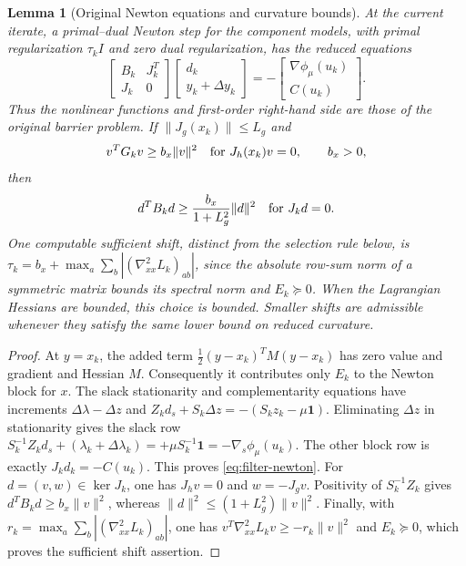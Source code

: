 \documentclass[pdflatex,sn-mathphys-num]{sn-jnl}
\theoremstyle{thmstyleone}
\newtheorem{lemma}[theorem]{Lemma}
\theoremstyle{thmstylethree}
\begin{document}
\begin{lemma}[Original Newton equations and curvature bounds]
\label{lem:filtered-newton}
At the current iterate, a primal--dual Newton step for the component models,
with primal regularization $\tau_k I$ and zero dual regularization,
has the reduced equations
\begin{equation}
 \begin{bmatrix}B_k&J_k^T\\J_k&0\end{bmatrix}
 \begin{bmatrix}d_k\\y_k+\Delta y_k\end{bmatrix}
 =-\begin{bmatrix}\nabla\phi_\mu(u_k)\\C(u_k)\end{bmatrix}.
 \label{eq:filter-newton}
\end{equation}
Thus the nonlinear functions and first-order right-hand side are those
of the original barrier problem.
If $\|J_g(x_k)\|\leq L_g$ and
\begin{equation}
 v^TG_kv\geq b_x\|v\|^2
 \quad\hbox{for }J_h(x_k)v=0,\qquad b_x>0 ,
 \label{eq:filter-physical-coercivity}
\end{equation}
then
\begin{equation}
 d^TB_kd\geq \frac{b_x}{1+L_g^2}\|d\|^2
 \quad\hbox{for }J_kd=0 .
 \label{eq:filter-full-coercivity}
\end{equation}
One computable sufficient shift, distinct from the selection rule below, is
$\tau_k=b_x+\max_a\sum_b| (\nabla^2_{xx}L_k)_{ab}|$,
since the absolute row-sum norm of a symmetric matrix bounds its
spectral norm and $E_k\succeq0$.
When the Lagrangian Hessians are bounded, this choice is bounded.
Smaller shifts are admissible whenever they satisfy the same
lower bound on reduced curvature.
\end{lemma}
\begin{proof}
At $y=x_k$, the added term
$\tfrac12(y-x_k)^TM(y-x_k)$ has zero value and gradient and Hessian $M$.
Consequently it contributes only $E_k$ to the Newton block for $x$.
The slack stationarity and complementarity equations have increments
$\Delta\lambda-\Delta z$ and
$Z_kd_s+S_k\Delta z=-(S_kz_k-\mu\mathbf1)$.
Eliminating $\Delta z$ in stationarity gives the slack row
$S_k^{-1}Z_kd_s+(\lambda_k+\Delta\lambda_k)
 =+\mu S_k^{-1}\mathbf1=-\nabla_s\phi_\mu(u_k)$.
The other block row is exactly $J_kd_k=-C(u_k)$.
This proves \eqref{eq:filter-newton}.
For $d=(v,w)\in\ker J_k$, one has
$J_hv=0$ and $w=-J_gv$. Positivity of $S_k^{-1}Z_k$ gives
$d^TB_kd\geq b_x\|v\|^2$, whereas
$\|d\|^2\leq(1+L_g^2)\|v\|^2$.
Finally, with $r_k=\max_a\sum_b| (\nabla^2_{xx}L_k)_{ab}|$,
one has $v^T\nabla^2_{xx}L_kv\geq-r_k\|v\|^2$ and
$E_k\succeq0$, which proves the sufficient shift assertion.
\end{proof}
\end{document}
